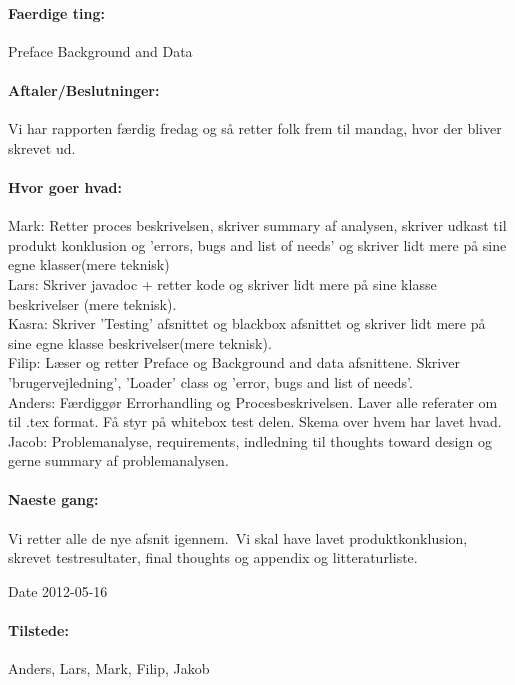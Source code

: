 \documentclass[a4paper,10pt,titlepage]{article}
\begin{document}
		\paragraph{Faerdige ting:}
		Preface
Background and Data

		\paragraph{Aftaler/Beslutninger:}
		Vi har rapporten færdig fredag og så retter folk frem til mandag, hvor der bliver skrevet ud. 
		\paragraph{Hvor goer hvad:}
		Mark: Retter proces beskrivelsen, skriver summary af analysen, skriver udkast til produkt konklusion og ’errors, bugs and list of needs’ og skriver lidt mere på sine egne klasser(mere teknisk)\\
Lars: Skriver javadoc + retter kode og skriver lidt mere på sine klasse beskrivelser (mere teknisk).\\
Kasra: Skriver ’Testing’ afsnittet og blackbox afsnittet og skriver lidt mere på sine egne klasse beskrivelser(mere teknisk).\\
Filip: Læser og retter Preface og Background and data afsnittene. Skriver ’brugervejledning’, ’Loader’ class og ’error, bugs and list of needs’.\\
Anders: Færdiggør Errorhandling og Procesbeskrivelsen. Laver alle referater om til .tex format. Få styr på whitebox test delen.  Skema over hvem har lavet hvad.\\
Jacob: Problemanalyse, requirements, indledning til thoughts toward design og gerne summary af problemanalysen. 

		\paragraph{Naeste gang:} 
		Vi retter alle de nye afsnit igennem.\
Vi skal have lavet produktkonklusion, skrevet testresultater, final thoughts og appendix og litteraturliste. 

\begin{center}
		Date 2012-05-16
		\end{center}
		
		\paragraph{Tilstede:} Anders, Lars, Mark, Filip, Jakob
		
\end{document}
